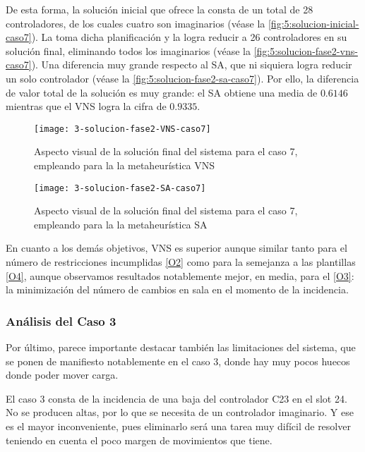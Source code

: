 De esta forma, la solución inicial que ofrece la \faseuno{} consta de un total de 28 controladores, de los cuales cuatro son imaginarios (véase la \autoref{fig:5:solucion-inicial-caso7}). La \fasedos{} toma dicha planificación y la logra reducir a 26 controladores en su solución final, eliminando todos los imaginarios (véase la \autoref{fig:5:solucion-fase2-vns-caso7}). Una diferencia muy grande respecto al SA, que ni siquiera logra reducir un solo controlador (véase la \autoref{fig:5:solucion-fase2-sa-caso7}). Por ello, la diferencia de valor total de la solución es muy grande: el SA obtiene una media de $0.6146$ mientras que el VNS logra la cifra de $0.9335$.

\begin{figure}
	\centering
	\texttt{[image: 3-solucion-fase2-VNS-caso7]}
	\caption{Aspecto visual de la solución final del sistema para el caso 7, empleando para la \fasedos{} la metaheurística VNS}
	\label{fig:5:solucion-fase2-vns-caso7}
\end{figure}

\begin{figure}
	\centering
	\texttt{[image: 3-solucion-fase2-SA-caso7]}
	\caption{Aspecto visual de la solución final del sistema para el caso 7, empleando para la \fasedos{} la metaheurística SA}
	\label{fig:5:solucion-fase2-sa-caso7}
\end{figure}

En cuanto a los demás objetivos, VNS es superior aunque similar tanto para el número de restricciones incumplidas \ref{O2} como para la semejanza a las plantillas \ref{O4}, aunque observamos resultados notablemente mejor, en media, para el \ref{O3}: la minimización del número de cambios en sala en el momento de la incidencia.

\subsubsection{Análisis del Caso 3}

Por último, parece importante destacar también las limitaciones del sistema, que se ponen de manifiesto notablemente en el caso 3, donde hay muy pocos huecos donde poder mover carga. 

El caso 3 consta de la incidencia de una baja del controlador C23 en el slot 24. No se producen altas, por lo que se necesita de un controlador imaginario. Y ese es el mayor inconveniente, pues eliminarlo será una tarea muy difícil de resolver teniendo en cuenta el poco margen de movimientos que tiene. 

